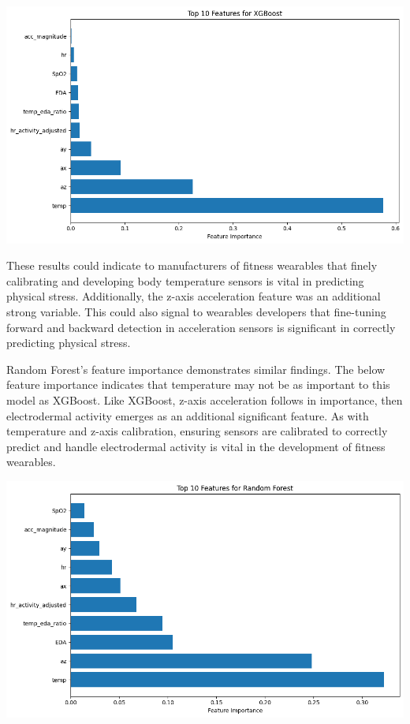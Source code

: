 \documentclass{article}
\begin{document}
\begin{center}
    \includegraphics[scale = .25]{images/XGBOOST FI.png}
\end{center}

These results could indicate to manufacturers of fitness wearables that finely calibrating and developing body temperature sensors is vital in predicting physical stress. Additionally, the z-axis acceleration feature was an additional strong variable. This could also signal to wearables developers that fine-tuning forward and backward detection in acceleration sensors is significant in correctly predicting physical stress. 

Random Forest's feature importance demonstrates similar findings. The below feature importance indicates that temperature may not be as important to this model as XGBoost. Like XGBoost, z-axis acceleration follows in importance, then electrodermal activity emerges as an additional significant feature. As with temperature and z-axis calibration, ensuring sensors are calibrated to correctly predict and handle electrodermal activity is vital in the development of fitness wearables. 

\begin{center}
    \includegraphics[scale = .25]{images/RF FI.png}
\end{center}
\end{document}
